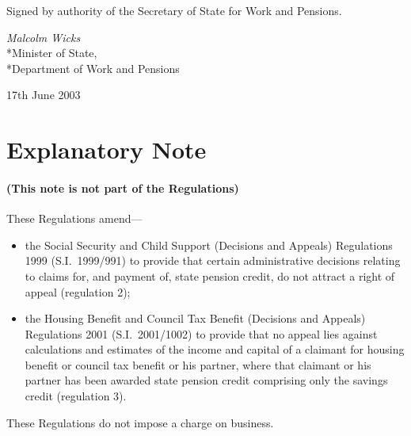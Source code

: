 \documentclass[12pt,a4paper]{article}
\begin{document}
\bigskip

Signed 
by authority of the Secretary of State for Work and Pensions.

{\raggedleft
\emph{Malcolm Wicks}\\*Minister of State,\\*Department of Work and Pensions

}


17th June 2003

\small

\part{Explanatory Note}

\renewcommand\parthead{— Explanatory Note}

\subsection*{(This note is not part of the Regulations)}

These Regulations amend—
\begin{itemize}
\item    the Social Security and Child Support (Decisions and Appeals) Regulations 1999 (S.I.\ 1999/991) to provide that certain administrative decisions relating to claims for, and payment of, state pension credit, do not attract a right of appeal (regulation 2);
\item
    the Housing Benefit and Council Tax Benefit (Decisions and Appeals) Regulations 2001 (S.I.\ 2001/1002) to provide that no appeal lies against calculations and estimates of the income and capital of a claimant for housing benefit or council tax benefit or his partner, where that claimant or his partner has been awarded state pension credit comprising only the savings credit (regulation 3). 
\end{itemize}

These Regulations do not impose a charge on business. 
\end{document}
